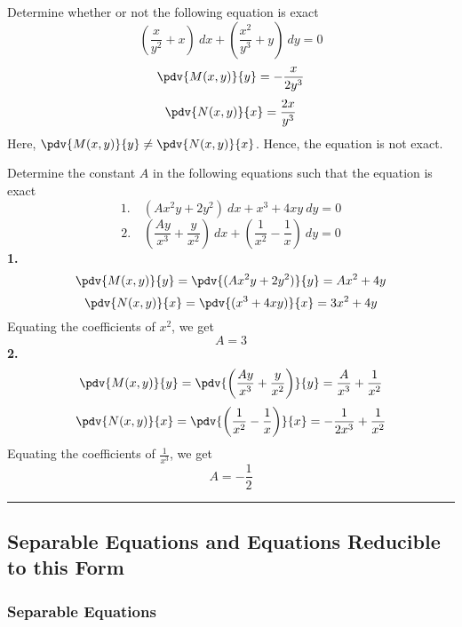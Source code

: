 \begin{example}{
    Determine whether or not the following equation is exact
    \[ \left(\dfrac{x}{y^2} + x\right) \: d{x} + \left(\dfrac{x^2}{y^3} + y\right) \: d{y} = 0 \]
    }{}
    \[ \pdv{M(x,y)}{y} = -\frac{x}{2y^3} \]
    \[ \pdv{N(x,y)}{x} = \frac{2x}{y^3} \]
    Here, $\pdv{M(x,y)}{y} \neq \pdv{N(x,y)}{x}$. Hence, the equation is not exact.
\end{example}

\begin{example}{Determine the constant $A$ in the following equations such that the equation is exact
    \begin{equation*} 1.\quad
        (Ax^2y + 2y^2) \: d{x} + x^3 + 4xy \: d{y} = 0
    \end{equation*}
    \begin{equation*} 2.\quad
        \left( \frac{Ay}{x^3} + \frac{y}{x^2} \right) \: d{x} + \left( \frac{1}{x^2} - \frac{1}{x} \right) \: d{y} = 0
    \end{equation*}
}{}
    \textbf{1.}
    \[ \pdv{M(x,y)}{y} = \pdv{(Ax^2y + 2y^2)}{y} = Ax^2 + 4y \]
    \[ \pdv{N(x,y)}{x} = \pdv{(x^3 + 4xy)}{x} = 3x^2 + 4y \]
    Equating the coefficients of $x^2$, we get \[
        \boxed{A=3}
    \]
    \textbf{2.}
    \[ \pdv{M(x,y)}{y} = \pdv{ \left( \frac{Ay}{x^3} + \frac{y}{x^2} \right) }{y} = \frac{A}{x^3} + \frac{1}{x^2} \]
    \[ \pdv{N(x,y)}{x} = \pdv{ \left( \frac{1}{x^2} - \frac{1}{x} \right) }{x} = -\frac{1}{2x^3} + \frac{1}{x^2} \]
    Equating the coefficients of $\frac{1}{x^3}$, we get \[
        \boxed{A = -\frac{1}{2}}
    \]
\end{example}


\vspace{20pt}\rule{3in}{1pt}
\subsection{Separable Equations and Equations Reducible to this Form}


\subsubsection{Separable Equations}

